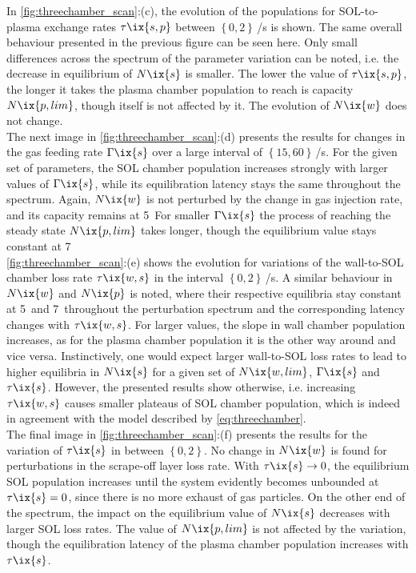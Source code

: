 %
            In \cref{fig:threechamber_scan}:(c), the evolution of the populations for SOL-to-plasma exchange rates $\tau\ix{s,p}$ between $\left\{0, 2\right\}$\,\SI{}{\arbitraryunit}/s is shown. The same overall behaviour presented in the previous figure can be seen here. Only small differences across the spectrum of the parameter variation can be noted, i.e. the decrease in equilibrium of $N\ix{s}$ is smaller. The lower the value of $\tau\ix{s,p}$, the longer it takes the plasma chamber population to reach is capacity $N\ix{p,lim}$, though itself is not affected by it. The evolution of $N\ix{w}$ does not change.\\%
            The next image in \cref{fig:threechamber_scan}:(d) presents the results for changes in the gas feeding rate $\Gamma\ix{s}$ over a large interval of $\left\{15, 60\right\}$\,\SI{}{\arbitraryunit}/s. For the given set of parameters, the SOL chamber population increases strongly with larger values of $\Gamma\ix{s}$, while its equilibration latency stays the same throughout the spectrum. Again, $N\ix{w}$ is not perturbed by the change in gas injection rate, and its capacity remains at 5\,\SI{}{\arbitraryunit} For smaller $\Gamma\ix{s}$ the process of reaching the steady state $N\ix{p,lim}$ takes longer, though the equilibrium value stays constant at 7\,\SI{}{\arbitraryunit}\\%
            \cref{fig:threechamber_scan}:(e) shows the evolution for variations of the wall-to-SOL chamber loss rate $\tau\ix{w,s}$ in the interval $\left\{0, 2\right\}$\,\SI{}{\arbitraryunit}/s. A similar behaviour in $N\ix{w}$ and $N\ix{p}$ is noted, where their respective equilibria stay constant at 5\,\SI{}{\arbitraryunit} and 7\,\SI{}{\arbitraryunit} throughout the perturbation spectrum and the corresponding latency changes with $\tau\ix{w,s}$. For larger values, the slope in wall chamber population increases, as for the plasma chamber population it is the other way around and vice versa. Instinctively, one would expect larger wall-to-SOL loss rates to lead to higher equilibria in $N\ix{s}$ for a given set of $N\ix{w,lim}$, $\Gamma\ix{s}$ and $\tau\ix{s}$. However, the presented results show otherwise, i.e. increasing $\tau\ix{w,s}$ causes smaller plateaus of SOL chamber population, which is indeed in agreement with the model described by \cref{eq:threechamber}.\\%
            The final image in \cref{fig:threechamber_scan}:(f) presents the results for the variation of $\tau\ix{s}$ in between $\left\{0, 2\right\}$. No change in $N\ix{w}$ is found for perturbations in the scrape-off layer loss rate. With $\tau\ix{s}\rightarrow0$, the equilibrium SOL population increases until the system evidently becomes unbounded at $\tau\ix{s}=0$, since there is no more exhaust of gas particles. On the other end of the spectrum, the impact on the equilibrium value of $N\ix{s}$ decreases with larger SOL loss rates. The value of $N\ix{p,lim}$ is not affected by the variation, though the equilibration latency of the plasma chamber population increases with $\tau\ix{s}$.\\%
